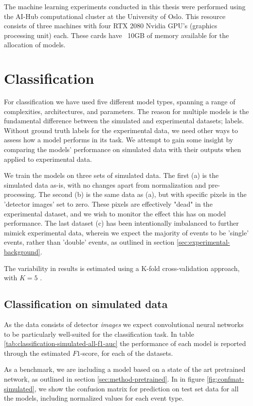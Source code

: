 The machine learning experiments conducted in this thesis were performed
using the AI-Hub computational cluster at the University of Oslo. This resource 
consists of three machines with four RTX 2080 Nvidia GPU’s (graphics
processing unit) each. These cards have ~10GB of memory available for the
allocation of models.
\section{Classification}
For classification we have used five different model types,
spanning a range of complexities, architectures, and parameters.
The reason for multiple models is the fundamental difference between the
simulated and experimental datasets; labels. Without ground truth labels
for the experimental data, we need other ways to assess how a model performs in
its task. We attempt to gain some insight by comparing the models' performance on
simulated data with their outputs when applied to experimental data.

\noindent We train the models on three sets of simulated data.
The first (a) is the simulated data as-is, with no changes apart from normalization
and pre-processing. The second (b) is the same data as (a), but with specific pixels in
the 'detector images' set to zero. These pixels are effectively "dead" in the
experimental dataset, and we wish to monitor the effect this has on model performance.
The last dataset (c) has been intentionally imbalanced to further mimick experimental data,
wherein we expect the majority of events to be 'single' events, rather than 'double'
events, as outlined in section \ref{sec:experimental-background}.

\noindent The variability in results is estimated using a K-fold cross-validation approach, with
$K = 5$ \cite{Stone1974}.

\subsection{Classification on simulated data}
As the data consists of detector \textit{images} we expect convolutional
neural networks to be particularly well-suited for the classification task.
In table \ref{tab:classification-simulated-all-f1-auc} the performance of each model
is reported through the estimated $F1$-score, for each of the datasets. 

As a benchmark, we are including a model based on a state of the art pretrained 
network\cite{Simonyan2015}, as outlined in section \ref{sec:method-pretrained}. 
In in figure \ref{fig:confmat-simulated}, we show the confusion matrix for prediction
on test set data for all the models, including normalized values for each event type.
 

